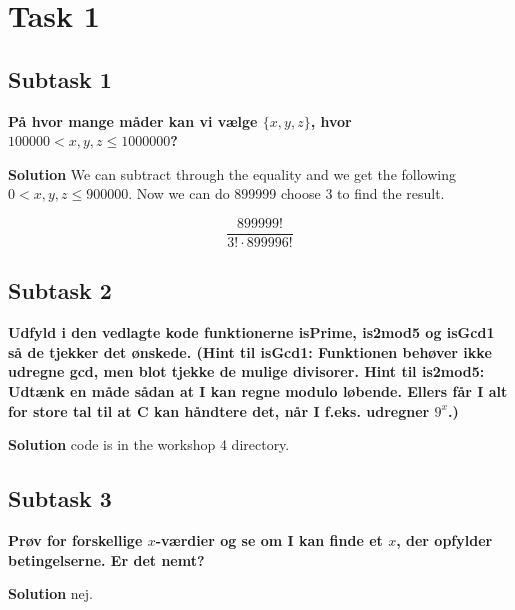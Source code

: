 
\section{Task 1}
\subsection{Subtask 1}
\noindent
\textbf{På hvor mange måder kan vi vælge $\{x,y,z\}$, hvor $100000<x,y,z\leq 1000000$?}

\bigskip
\noindent
\textbf{Solution}
We can subtract through the equality and we get the following $0<x,y,z\leq900000$. Now we can do 899999 choose 3 to find the result.

\begin{equation}
    \frac{899999!}{3!\cdot899996!}
\end{equation}

\subsection{Subtask 2}
\noindent
\textbf{Udfyld i den vedlagte kode funktionerne isPrime, is2mod5 og isGcd1 så de tjekker det ønskede. (Hint til isGcd1: Funktionen behøver ikke udregne gcd, men blot tjekke de mulige divisorer. Hint til is2mod5: Udtænk en måde sådan at I kan regne modulo løbende. Ellers får I alt for store tal til at C kan håndtere det, når I f.eks. udregner $9^x$.)}

\bigskip
\noindent
\textbf{Solution}
code is in the workshop 4 directory.

\subsection{Subtask 3}
\noindent
\textbf{Prøv for forskellige $x$-værdier og se om I kan finde et $x$, der opfylder betingelserne. Er det nemt?}

\bigskip
\noindent
\textbf{Solution}
nej.

